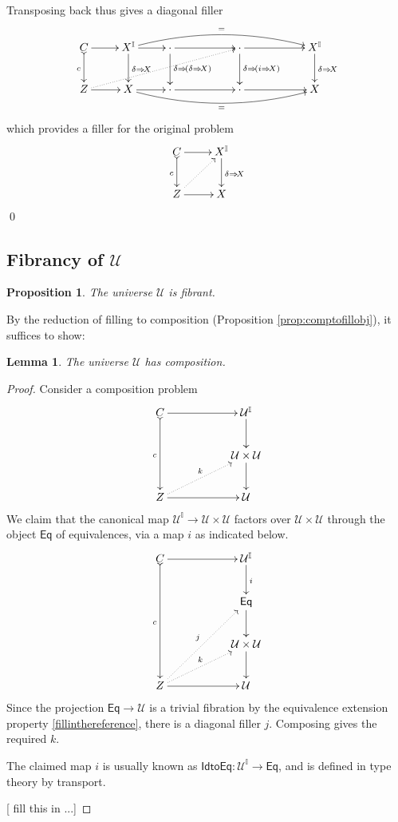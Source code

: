 \documentclass[12pt]{article}
\newcommand{\ra}{\ensuremath{\rightarrow}}
\newcommand{\II}{\ensuremath{\mathbb{I}}}
\newcommand{\U}{\ensuremath{\mathcal{U}}}
\newtheorem{proposition}[theorem]{Proposition}
\newtheorem{lemma}[theorem]{Lemma}
\theoremstyle{remark}
\theoremstyle{definition}
\begin{document}
Transposing back thus gives a diagonal filler
\[
\xymatrix{
C \ar@{>->}[d]_c \ar[r] & X^\II \ar[d]^{\delta\Rightarrow\!X}  \ar[r] \ar@/^1pc/[rrrrr]^{=} & \cdot \ar[d]^{\delta\Rightarrow\!(\delta\Rightarrow\!X)}  \ar[rr] 
	&& \cdot \ar[d]^{\delta\Rightarrow\!(i\Rightarrow\!X)}  \ar[rr]  && X^\II \ar[d]^{\delta\Rightarrow\!X}  \\
Z \ar[r] \ar@{..>}[rrrru] & X  \ar[r] \ar@/_1pc/[rrrrr]_{=} & \cdot  \ar[rr] && \cdot  \ar[rr] && X
}
\] 
which provides a filler for the original problem
\[
\xymatrix{
C \ar@{>->}[d]_c \ar[r] & X^\II \ar[d]^{\delta\Rightarrow\!X} \\
Z \ar[r] \ar@{..>}[ru] & X
}
\]
\qed

\subsection*{Fibrancy of $\U$}

\begin{proposition}
The universe $\U$ is fibrant.
\end{proposition}
By the reduction of filling to composition (Proposition \ref{prop:comptofillobj}), it suffices to show:
\begin{lemma}
The universe $\U$ has composition.
\end{lemma}
\begin{proof}
Consider a composition problem
\[
\xymatrix{
C \ar@{>->}[dd]_{c} \ar[rr]  && \U^\II \ar[d] \\
&& \U\times \U\ar[d] \\
Z \ar[rr]  \ar@{..>}[rru]^{k} && \U
}
\]
We claim that the canonical map $\U^\II \ra \U\times \U$ factors over $\U\times\U$ through the object $\mathsf{Eq}$ 
of equivalences, via a map $i$ as indicated below.
\begin{equation}\label{diag:idtoeq}
\xymatrix{
C \ar@{>->}[ddd]_{c} \ar[rr]  && \U^\II \ar[d]^i \\
&& \mathsf{Eq} \ar[d]  \\
&& \U\times \U\ar[d] \\
Z \ar[rr] \ar@{..>}[rruu]^{j}  \ar@{..>}[rru]^{k} && \U
}
\end{equation}
Since the projection $\mathsf{Eq} \ra \U$ is a trivial fibration by the equivalence extension property \ref{fillinthereference}, there is a diagonal filler $j$.  Composing gives the required $k$.

The claimed map $i$ is usually known as $\mathsf{IdtoEq}: \U^\II \ra \mathsf{Eq}$, and is defined in type theory by transport. 

[ fill this in ...]

\end{proof}
\end{document}
